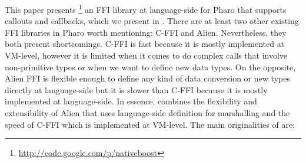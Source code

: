 


This paper presents \NBFFI\footnote{\url{http://code.google.com/p/nativeboost}} an FFI library at language-side for Pharo that supports callouts and callbacks, which we present in .
There are at least two other existing FFI libraries in Pharo worth mentioning: C-FFI and Alien.
Nevertheless, they both present shortcomings.
C-FFI is fast because it is mostly implemented at VM-level, however it is limited when it comes to do complex calls that involve non-primitive types or when we want to define new data types.
On the opposite, Alien FFI is flexible enough to define any kind of data conversion or new types directly at language-side but it is slower than C-FFI because it is mostly implemented at language-side.
In essence, \NBFFI combines the flexibility and extensibility of Alien that uses language-side definition for marshalling and the speed of C-FFI which is implemented at VM-level.
The main originalities of \NBFFI are:

